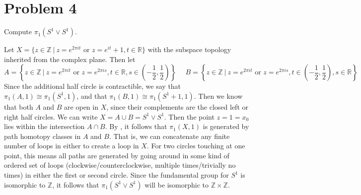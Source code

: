 \documentclass{article}
\theoremstyle{definition}
\begin{document}
\section*{Problem 4}
\begin{mdframed}[]
    Compute $\pi_1(S^1 \vee S^1)$.
\end{mdframed}
Let $X = \{ z \in \mathbb{Z} \ | \ z = e^{2\pi i t} \text{ or } z=e^{it} + 1, t \in \mathbb{R}\}$ with the subspace topology inherited from the 
complex plane. Then let 
\[
    A = \left\{ z \in \mathbb{Z} \ | \ z = e^{2\pi it} \text{ or } z=e^{2\pi is}, t \in \mathbb{R}, s \in \left(-\frac{1}{2},\frac{1}{2}\right)\right\}
    \ \ \ \ \ \ 
    B = \left\{ z \in \mathbb{Z} \ | \ z = e^{2\pi it} \text{ or } z=e^{2\pi is}, t \in \left(-\frac{1}{2},\frac{1}{2}\right), s \in \mathbb{R}\right\}
\]
Since the additional half circle is contractible, we say that $\pi_1(A,1) \cong \pi_1(S^1,1)$, and that $\pi_1(B,1) \cong \pi_1(S^1 + 1, 1)$. 
Then we know that both $A$ and $B$ are open in $X$, since their complements are the closed left or right half circles. We can write 
$X = A \cup B = S^1 \vee S^1$. Then the point $z = 1 = x_0$ lies within the intersection $A \cap B$. By \fbox{Theorem 59.1 (Munkres)},
it follows that $\pi_1(X, 1)$ is generated by path homotopy classes in $A$ and $B$. That is, we can concatenate 
any finite number of loops in either to create a loop in $X$. For two circles touching at one point, this means all paths are 
generated by going around in some kind of ordered set of loops (clockwise/counterclockwise, multiple times/trivially no times) in either the first 
or second circle. Since the fundamental group for $S^1$ is isomorphic to $\mathbb{Z}$, it follows that 
$\pi_1(S^1 \vee S^1)$ will be isomorphic to $\mathbb{Z} \times \mathbb{Z}$.
\end{document}
